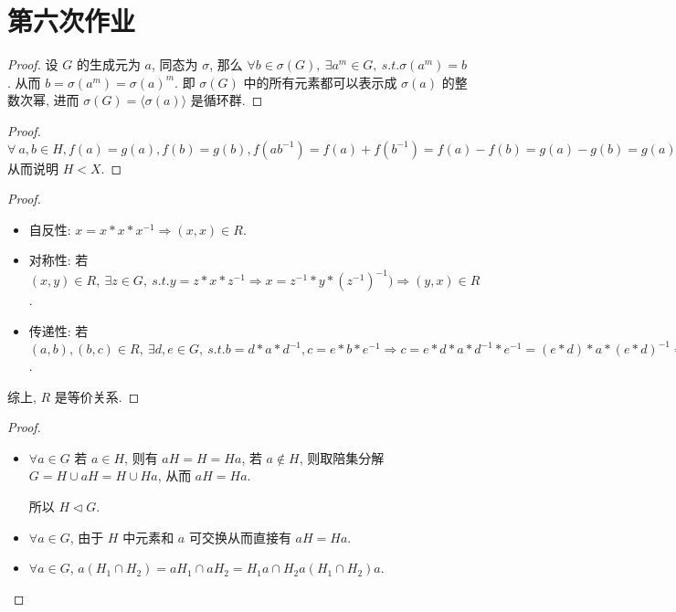 \chapter*{第六次作业}

\problem[习题六 54]

\begin{proof}
	设 $G$ 的生成元为 $a$, 同态为 $\sigma$, 那么 $\forall b\in \sigma(G),\ \exists a^m\in G,\ s.t. \sigma(a^m)=b$. 从而 $b=\sigma(a^m)=\sigma(a)^m$. 即 $\sigma(G)$ 中的所有元素都可以表示成 $\sigma(a)$ 的整数次幂, 进而 $\sigma(G)=\langle \sigma(a)\rangle$ 是循环群.
\end{proof}

\problem[习题六 56]

\begin{proof}
	$\forall\ a,b\in H,f(a)=g(a),f(b)=g(b),f(ab^{-1})=f(a)+f(b^{-1})=f(a)-f(b)=g(a)-g(b)=g(a)+g(b^{-1})=g(ab^{-1})\Rightarrow ab^{-1}\in H$ 从而说明 $H<X$.
\end{proof}

\problem[习题六 57]

\begin{proof}
	\begin{itemize}
		\item[(1)] 自反性:
			$x=x*x*x^{-1}\Rightarrow (x,x)\in R$.
		\item[(2)] 对称性:
			若 $(x,y)\in R,\ \exists z\in G,\ s.t. y=z*x*z^{-1}\Rightarrow x=z^{-1}*y*(z^{-1})^{-1})\Rightarrow (y,x)\in R$.
		\item[(3)] 传递性:
			若 $(a,b),(b,c)\in R,\ \exists d,e\in G,\ s.t. b=d*a*d^{-1},c=e*b*e^{-1}\Rightarrow c=e*d*a*d^{-1}*e^{-1}=(e*d)*a*(e*d)^{-1}\Rightarrow (a,c)\in R$.
	\end{itemize}
	综上, $R$ 是等价关系.
\end{proof}

\problem[习题六 58]

\begin{proof}
	\begin{itemize}
		\item[(1)] $\forall a\in G$ 若 $a\in H$, 则有 $aH=H=Ha$, 若 $a\notin H$, 则取陪集分解 $G=H\cup aH=H\cup Ha$, 从而 $aH=Ha$.

		所以 $H\lhd G$.
		\item[(2)] $\forall a\in G$, 由于 $H$ 中元素和 $a$ 可交换从而直接有 $aH=Ha$.
		\item[(3)] $\forall a\in G$, $a(H_1\cap H_2)=aH_1\cap aH_2=H_1a\cap H_2a(H_1\cap H_2)a$.
	\end{itemize}
\end{proof}

